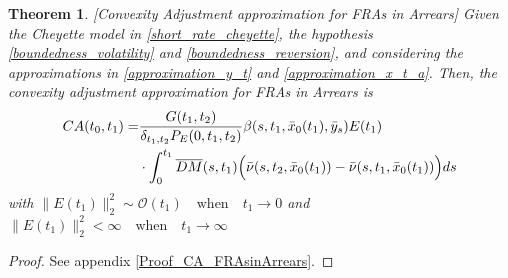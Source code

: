 \documentclass[a4paper,10pt]{article}
\newtheorem{theorem}{Theorem}[section]
\newcommand{\1}{\mathbf{1}}
\begin{document}
\begin{theorem}\label{Th_CA_FRAsinArrears}[Convexity Adjustment approximation for FRAs in Arrears]
Given the Cheyette model in \eqref{short_rate_cheyette}, the hypothesis \ref{boundedness_volatility} and \ref{boundedness_reversion}, and considering the approximations in \eqref{approximation_y_t} and \eqref{approximation_x_t_a}. Then, the convexity adjustment approximation for FRAs in Arrears is 
\begin{align}\label{ca_approximations_fra_arrears}
CA(t_0,t_1) =   &\frac{G(t_1,t_2)}{\delta_{t_1,t_2}P_{E}(0,t_1,t_2)} \beta(s,t_1, \bar{x}_0(t_1), \bar{y}_s) E(t_1) \nonumber \\
&\cdot \int_{0}^{t_1} \overline{DM}(s,t_1) \Bigl(\bar{\nu}(s,t_2,\bar{x}_{0}(t_1))-\bar{\nu}(s,t_1,\bar{x}_{0}(t_1))\Bigr) ds 
\end{align}
with $\|E(t_1)\|^{2}_{2} \sim \mathcal{O}(t_1) \quad \text{when} \quad t_1 \to 0$ and $\|E(t_1)\|^{2}_{2} < \infty \quad \text{when} \quad t_1 \to \infty$
\end{theorem}
\begin{proof}
See appendix \ref{Proof_CA_FRAsinArrears}.
\end{proof}
\end{document}

